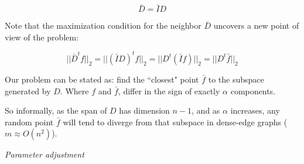 \documentclass[a4paper,11pt]{article}
\begin{document}
$$\bar{D} = \bar{I} D$$

Note that the maximization condition for the neighbor $\bar{D}$ uncovers 
a new point of view of the problem:

$$||\bar{D}^tf||_2 = ||(\bar{I} D)^t f||_2 = ||D^t (\bar{I} f)||_2 = 
||D^t \bar{f}||_2$$

Our problem can be stated as: find the ``closest" point $\bar{f}$ to 
the subspace generated by $D$. Where $f$ and $\bar{f}$, differ in the 
sign of exactly $\alpha$ components.

\bigskip

So informally, as the span of $D$ has dimension $n-1$, and as $\alpha$ 
increases, any random point $\bar{f}$ will tend to diverge from that 
subspace in dense-edge graphs ($m \approx O(n^2)$).

\bigskip

\emph{Parameter adjustment}

\bigskip
\end{document}
